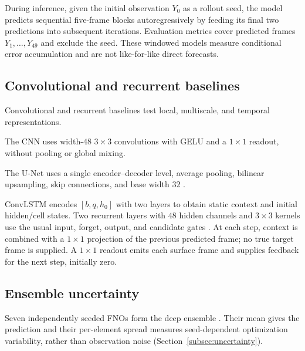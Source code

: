 During inference, given the initial observation $Y_0$ as a rollout seed, the model predicts sequential five-frame blocks autoregressively by feeding its final two predictions into subsequent iterations. Evaluation metrics cover predicted frames $Y_1,\ldots,Y_{49}$ and exclude the seed. These windowed models measure conditional error accumulation and are not like-for-like direct forecasts.

\subsection{Convolutional and recurrent baselines}
\label{subsec:conv-baseline}
Convolutional and recurrent baselines test local, multiscale, and temporal representations.

The CNN uses width-$48$ $3\times3$ convolutions with GELU and a $1\times1$ readout, without pooling or global mixing.

The U-Net uses a single encoder--decoder level, average pooling, bilinear upsampling, skip connections, and base width $32$ \citep{ronneberger2015unet}.

ConvLSTM encodes $[b,q,h_0]$ with two layers to obtain static context and initial hidden/cell states. Two recurrent layers with $48$ hidden channels and $3\times3$ kernels use the usual input, forget, output, and candidate gates \citep{shi2015convlstm}. At each step, context is combined with a $1\times1$ projection of the previous predicted frame; no true target frame is supplied. A $1\times1$ readout emits each surface frame and supplies feedback for the next step, initially zero.

\subsection{Ensemble uncertainty}
\label{subsec:model-ensemble}
Seven independently seeded FNOs form the deep ensemble \citep{lakshminarayanan2017deepensembles}. Their mean gives the prediction and their per-element spread measures seed-dependent optimization variability, rather than observation noise (Section~\ref{subsec:uncertainty}).
